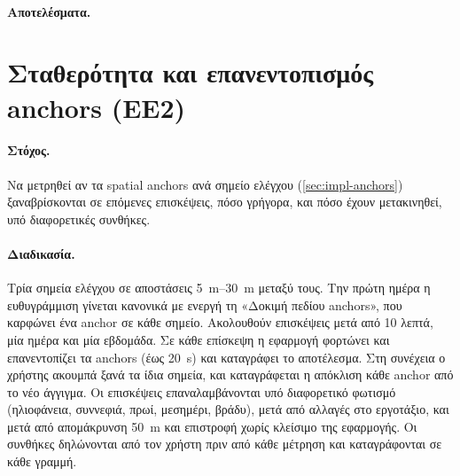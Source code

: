 \paragraph{Αποτελέσματα.}\mbox{}


\section{Σταθερότητα και επανεντοπισμός anchors (ΕΕ2)}
\label{sec:exp-anchors}

\paragraph{Στόχος.} Να μετρηθεί αν τα spatial anchors ανά σημείο ελέγχου (\cref{sec:impl-anchors}) ξαναβρίσκονται σε επόμενες επισκέψεις, πόσο γρήγορα, και πόσο έχουν μετακινηθεί, υπό διαφορετικές συνθήκες.

\paragraph{Διαδικασία.} Τρία σημεία ελέγχου σε αποστάσεις \SIrange{5}{30}{m} μεταξύ τους. Την πρώτη ημέρα η ευθυγράμμιση γίνεται κανονικά με ενεργή τη «Δοκιμή πεδίου anchors», που καρφώνει ένα anchor σε κάθε σημείο. Ακολουθούν επισκέψεις μετά από 10 λεπτά, μία ημέρα και μία εβδομάδα. Σε κάθε επίσκεψη η εφαρμογή φορτώνει και επανεντοπίζει τα anchors (έως \SI{20}{s}) και καταγράφει το αποτέλεσμα. Στη συνέχεια ο χρήστης ακουμπά ξανά τα ίδια σημεία, και καταγράφεται η απόκλιση κάθε anchor από το νέο άγγιγμα. Οι επισκέψεις επαναλαμβάνονται υπό διαφορετικό φωτισμό (ηλιοφάνεια, συννεφιά, πρωί, μεσημέρι, βράδυ), μετά από αλλαγές στο εργοτάξιο, και μετά από απομάκρυνση \SI{50}{m} και επιστροφή χωρίς κλείσιμο της εφαρμογής. Οι συνθήκες δηλώνονται από τον χρήστη πριν από κάθε μέτρηση και καταγράφονται σε κάθε γραμμή.

